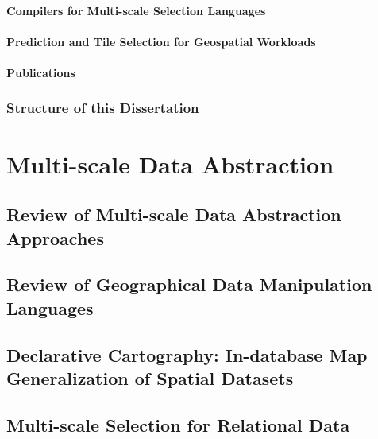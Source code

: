 \documentclass[11pt, oneside]{report}   	%
\begin{document}
\subsection{Compilers for Multi-scale Selection Languages}
\subsection{Prediction and Tile Selection for Geospatial Workloads}
\subsection{Publications}

\section{Structure of this Dissertation}

\part{Multi-scale Data Abstraction}
\chapter{Review of Multi-scale Data Abstraction Approaches}
\chapter{Review of Geographical Data Manipulation Languages}
\chapter{Declarative Cartography: In-database Map Generalization of Spatial Datasets}
\chapter{Multi-scale Selection for Relational Data}
\end{document}
